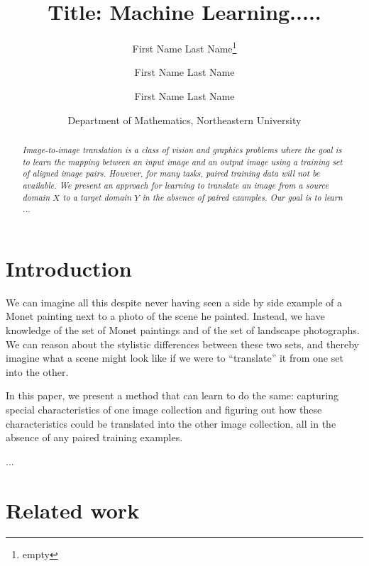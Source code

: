 \documentclass[10pt,twocolumn,letterpaper]{article}
\begin{document}
\title{Title: Machine Learning.....}

\author{
First Name Last Name\thanks{empty}
\and
First Name Last Name\footnotemark[1]
\and 
First Name Last Name
\and
Department of Mathematics, Northeastern University
}





\begin{abstract}
 
\textit{Image-to-image translation is a class of vision and graphics problems where the goal is to learn the mapping between an input image and an output image using a training set of aligned image pairs.   
However, for many tasks, paired training data will not be available.  We present an approach for learning to translate an image from a source domain $X$ to a target domain $Y$ in the absence of paired examples.  Our goal is to learn ...}
\end{abstract}

 


\section{Introduction}
 \label{Intro: }

 

We can imagine all this despite never having seen a side by side example of a Monet painting next to a photo of the scene he painted. Instead, we have knowledge of the set of Monet paintings and of the set of landscape photographs. We can reason about the stylistic differences between these two sets, and thereby imagine what a scene might look like if we were to ``translate'' it from one set into the other.

In this paper, we present a method that can learn to do the same: capturing special characteristics of one image collection and figuring out how these characteristics could be translated into the other image collection, all in the absence of any paired training examples. 
 
 ...
 
\section{Related work}
 
\end{document}

